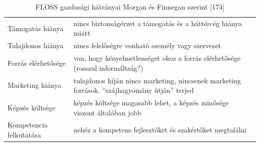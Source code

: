 \documentclass[12pt,magyar,a4paper,oneside]{scrreprt}
\begin{document}
\hypertarget{tbl:Huxe1truxe1ny}{}
\begin{longtable}[]{@{}ll@{}}
\caption{\label{tbl:Huxe1truxe1ny}FLOSS gazdasági hátrányai Morgan és
Finnegan szerint {[}174{]}}\tabularnewline
\toprule
\endhead
\begin{minipage}[t]{0.19\columnwidth}\raggedright
Támogatás hiánya\strut
\end{minipage} & \begin{minipage}[t]{0.75\columnwidth}\raggedright
nincs biztonságérzet a támogatás és a háttércég hiánya miatt\strut
\end{minipage}\tabularnewline
\begin{minipage}[t]{0.19\columnwidth}\raggedright
Tulajdonos hiánya\strut
\end{minipage} & \begin{minipage}[t]{0.75\columnwidth}\raggedright
nincs felelőségre vonható személy vagy szervezet\strut
\end{minipage}\tabularnewline
\begin{minipage}[t]{0.19\columnwidth}\raggedright
Forrás elérhetősége\strut
\end{minipage} & \begin{minipage}[t]{0.75\columnwidth}\raggedright
van, hogy kényelmetlenséget okoz a forrás elérhetősége (rosszul
informáltság?)\strut
\end{minipage}\tabularnewline
\begin{minipage}[t]{0.19\columnwidth}\raggedright
Marketing hiánya\strut
\end{minipage} & \begin{minipage}[t]{0.75\columnwidth}\raggedright
tulajdonos híján nincs marketing, nincsenek marketing források,
``szájhagyomány útján'' terjed\strut
\end{minipage}\tabularnewline
\begin{minipage}[t]{0.19\columnwidth}\raggedright
Képzés költsége\strut
\end{minipage} & \begin{minipage}[t]{0.75\columnwidth}\raggedright
képzés költsége magasabb lehet, a képzés minősége viszont általában
jobb\strut
\end{minipage}\tabularnewline
\begin{minipage}[t]{0.19\columnwidth}\raggedright
Kompetencia felkutatása\strut
\end{minipage} & \begin{minipage}[t]{0.75\columnwidth}\raggedright
nehéz a kompetens fejlesztőket és szakértőket megtalálni\strut
\end{minipage}\tabularnewline
\bottomrule
\end{longtable}
\end{document}

